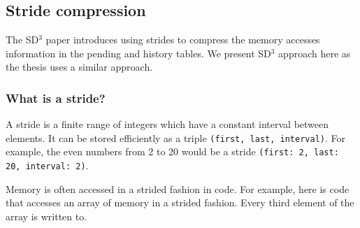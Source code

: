 \documentclass[12pt,twoside]{reedthesis}
\begin{document}
%	
%
%		
%
		\subsection{Stride compression}\label{sse:stride-descr}
		
		The SD$^3$ paper introduces using strides to compress the memory accesses information in the pending and history tables. We present SD$^3$ approach here as the thesis uses a similar approach. 
		
		\subsubsection{What is a stride?}
		
		A stride is a finite range of integers which have a constant interval between elements. It can be stored efficiently as a triple \texttt{(first, last, interval)}. For example, the even numbers from 2 to 20 would be a stride \texttt{(first: 2, last: 20, interval: 2)}.
		
		Memory is often accessed in a strided fashion in code.
		For example, here is code that accesses an array of memory in a strided fashion. Every third element of the array is written to. 
		
\end{document}
